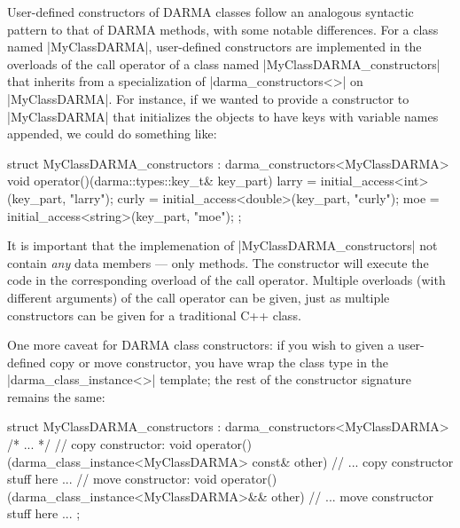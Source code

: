 User-defined constructors of DARMA classes follow an analogous syntactic pattern
to that of DARMA methods, with some notable differences.  For a class named
|MyClassDARMA|, user-defined constructors are implemented in the overloads
of the call operator of a class named |MyClassDARMA_constructors| that inherits
from a specialization of |darma_constructors<>| on |MyClassDARMA|.  For
instance, if we wanted to provide a constructor to |MyClassDARMA| that
initializes the \ahandleT objects to have keys with variable names appended, we
could do something like:
\begin{CppCodeNumb}
struct MyClassDARMA_constructors
  : darma_constructors<MyClassDARMA>
{
  void operator()(darma::types::key_t& key_part) {
    larry = initial_access<int>(key_part, "larry");
    curly = initial_access<double>(key_part, "curly");
    moe = initial_access<string>(key_part, "moe");
  }
};
\end{CppCodeNumb}
It is important that the implemenation of |MyClassDARMA_constructors|
not contain {\it any} data members --- only methods.  The constructor will
execute the code in the corresponding overload of the call operator.  Multiple
overloads (with different arguments) of the call operator can be given, just as
multiple constructors can be given for a traditional C++ class.

One more caveat for DARMA class constructors:  if you wish to given a
user-defined copy or move constructor, you have wrap the class type in the
|darma_class_instance<>| template; the rest of the constructor signature remains
the same:
\begin{CppCodeNumb}
struct MyClassDARMA_constructors
  : darma_constructors<MyClassDARMA>
{
  /* ... */
  // copy constructor:
  void operator()(darma_class_instance<MyClassDARMA> const& other) {
    // ... copy constructor stuff here ...
  }
  // move constructor:
  void operator()(darma_class_instance<MyClassDARMA>&& other) {
    // ... move constructor stuff here ...
  }
};
\end{CppCodeNumb}

\lstDeleteShortInline{\|}

 








